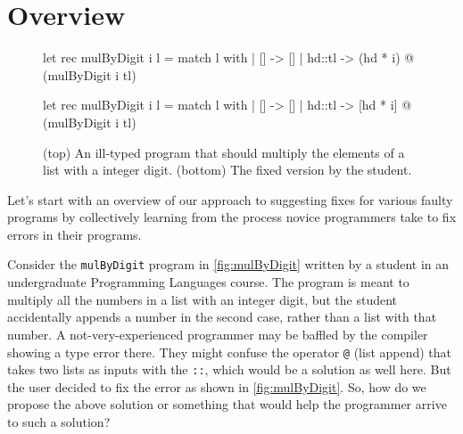 \section{Overview}
\label{sec:overview}

\begin{figure}[H]
    \begin{ecode}
      let rec mulByDigit i l =
        match l with
        | []     -> []
        | hd::tl -> (hd * i) @ (mulByDigit i tl)
    \end{ecode}

    \begin{ecode}
        let rec mulByDigit i l =
        match l with
        | []     -> []
        | hd::tl -> [hd * i] @ (mulByDigit i tl)
    \end{ecode}
    \caption{(top) An ill-typed \ocaml program that should multiply the elements of a list with a integer digit. (bottom) The fixed version by the student.}
    \label{fig:mulByDigit}
\end{figure}


Let’s start with an overview of our approach to suggesting fixes for various faulty programs by collectively learning from the process novice programmers take to fix errors in their programs.

 Consider the \texttt{mulByDigit} program in \autoref{fig:mulByDigit} written by a student in an undergraduate Programming Languages course. The program is meant to multiply all the numbers in a list with an integer digit, but the student accidentally appends a number in the second case, rather than a list with that number. A not-very-experienced programmer may be baffled by the compiler showing a type error there. They might confuse the operator \texttt{@} (list append) that takes two lists as inputs with the \texttt{::}, which would be a solution as well here. But the user decided to fix the error as shown in \autoref{fig:mulByDigit}. So, how do we propose the above solution or something that would help the programmer arrive to such a solution?

